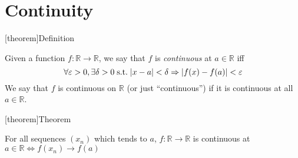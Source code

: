 \documentclass[12pt]{report}
\theoremstyle{definition}
\begin{document}
\section{Continuity}
[theorem]{Definition}
\begin{continuous function}
    Given a function $f:\mathbb{R} \rightarrow \mathbb{R}$, we say that $f$ is \emph{continuous} at $a \in \mathbb{R}$ 
    iff \[
        \forall \varepsilon > 0, \exists \delta > 0 \;\textnormal{s.t.}\; |x-a|<\delta \Rightarrow
        |f(x) - f(a)| < \varepsilon
    \]
    We say that $f$ is continuous on $\mathbb{R}$ (or just ``continuous'') if it is continuous at all $a \in \mathbb{R}$.
\end{continuous function}

[theorem]{Theorem}
\begin{continuity with convergent sequence}
    For all sequences $(x_n)$ which tends to $a$, 
    $f:\mathbb{R} \rightarrow \mathbb{R}$ is continuous at $a \in \mathbb{R} 
    \iff f(x_n) \rightarrow f(a)$
\end{continuity with convergent sequence}
\end{document}
